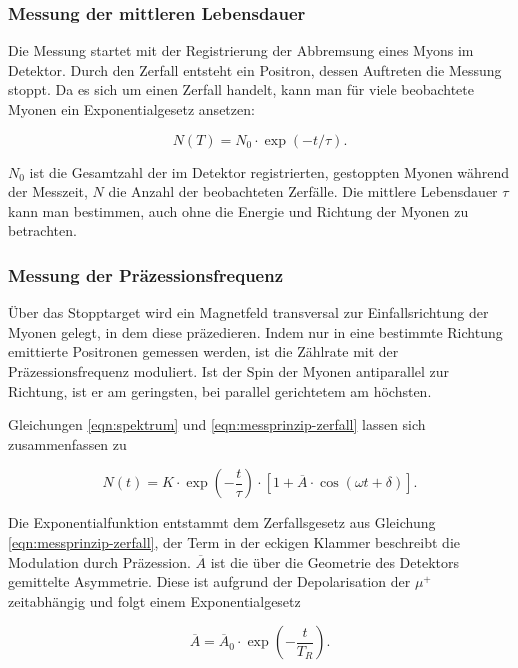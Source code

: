 \documentclass[a4paper,ngerman]{scrartcl}
\begin{document}
\subsubsection*{Messung der mittleren Lebensdauer}

Die Messung startet mit der Registrierung der Abbremsung eines Myons im Detektor. Durch den Zerfall entsteht ein Positron, dessen Auftreten die Messung stoppt. Da es sich um einen Zerfall handelt, kann man für viele beobachtete Myonen ein Exponentialgesetz ansetzen:

\begin{equation}
\label{eqn:messprinzip-zerfall}
N(T) = N_0 \cdot \exp(-t / \tau) .
\end{equation} 
	
$N_0$ ist die Gesamtzahl der im Detektor registrierten, gestoppten Myonen während der Messzeit, $N$ die Anzahl der beobachteten Zerfälle.
Die mittlere Lebensdauer $\tau$ kann man bestimmen, auch ohne die Energie und Richtung der Myonen zu betrachten. 

\subsubsection*{Messung der Präzessionsfrequenz}


Über das Stopptarget wird ein Magnetfeld transversal zur Einfallsrichtung der Myonen gelegt, in dem diese präzedieren.
Indem nur in eine bestimmte Richtung emittierte Positronen gemessen werden, ist die Zählrate mit der Präzessionsfrequenz moduliert. Ist der Spin der Myonen antiparallel zur Richtung, ist er am geringsten, bei parallel gerichtetem am höchsten.


Gleichungen \ref{eqn:spektrum} und \ref{eqn:messprinzip-zerfall}
lassen sich zusammenfassen zu

\begin{equation}
N(t) = K \cdot \exp(- \frac{t}{\tau}) \cdot \left[ 1 + \overline{A} \cdot \cos(\omega t + \delta) \right] .
\end{equation}

Die Exponentialfunktion entstammt dem Zerfallsgesetz aus Gleichung \ref{eqn:messprinzip-zerfall}, der Term in der eckigen Klammer beschreibt die Modulation durch Präzession.
$\overline{A}$ ist die über die Geometrie des Detektors gemittelte Asymmetrie. Diese ist aufgrund der Depolarisation der $\mu^{+}$ zeitabhängig und folgt einem Exponentialgesetz

\begin{equation}
\overline{A} = \overline{A}_0 \cdot \exp(- \frac{t}{ T_R }) .
\end{equation}
\end{document}
